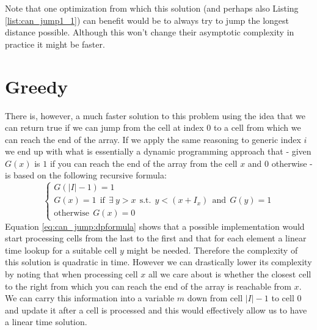 

Note that one optimization from which this solution (and perhaps also Listing
\ref{list:can_jump1_1}) can benefit would be to always try to jump the longest distance possible.
Although this won't change their asymptotic complexity in practice it might be faster.


\section{Greedy}
\label{can_jump:sec:greedy}
There is, however, a much faster solution to this problem using the idea that we can return
true if we can jump from the cell at index $0$ to a cell from which we can reach the end of the
array. If we apply the same reasoning to generic index $i$ we end up with what is essentially a dynamic
programming approach that -  given $G(x)$ is $1$ if you can reach the end of the array from the cell
$x$ and $0$ otherwise - is based on the following recursive formula:
\begin{equation}
    \begin{cases}
        G(|I|-1) = 1 \\
        G(x) = 1 \: \: \text{if} \: \: \exists \: y > x \:\: \text{s.t.} \:\: y < (x+I_x) \: \: \text{and} \: \:G(y) = 1\\
        \text{otherwise} \: \: G(x) = 0
     \end{cases}
    \label{eq:can_jump:dpformula}
\end{equation}
Equation \ref{eq:can_jump:dpformula} shows that a possible implementation would start processing
cells from the last to the first and that for each element a linear time lookup for a suitable cell
$y$ might be needed. Therefore the complexity of this solution is quadratic in time. However we can
drastically lower its complexity by noting that when processing cell $x$ all we care about is
whether the closest cell to the right from which you can reach the end of the array is reachable
from $x$. We can carry this information into a variable $m$ down from cell $|I|-1$ to cell $0$ and
update it after a cell is processed and this would effectively allow us to have a linear time
solution.

